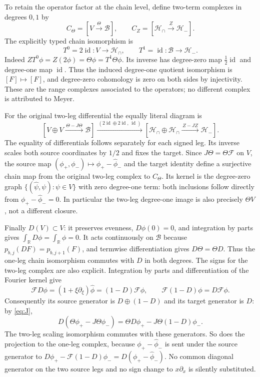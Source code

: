 \documentclass[11pt]{article}
\newcommand{\B}{\mathscr B}
\newcommand{\HH}{\mathcal H}
\newcommand{\R}{\mathbb R}
\newcommand{\id}{\operatorname{id}}
\newcommand{\F}{\mathcal F}
\begin{document}
To retain the operator factor at the chain level, define two-term
complexes in degrees $0,1$ by
\[
 C_\Theta=[V\xrightarrow{\Theta}\B],\qquad
 C_Z=[\HH_\cap\xrightarrow{Z}\HH_-].
\]
The explicitly typed chain isomorphism is
\begin{equation}\label{eq:chain}
 T^0=2\id:V\longrightarrow\HH_\cap,\qquad
 T^1=\id:\B\longrightarrow\HH_-.
\end{equation}
Indeed $ZT^0\phi=Z(2\phi)=\Theta\phi=T^1\Theta\phi$.
Its inverse has degree-zero map $\tfrac12\id$ and degree-one map
$\id$. Thus the induced degree-one quotient isomorphism is
$[F]\mapsto[F]$, and degree-zero cohomology is zero on both sides
by injectivity. These are the range complexes associated to the
operators; no different complex is attributed to Meyer.

For the original two-leg differential the equally literal diagram is
\[
 [V\oplus V\xrightarrow{\,\Theta-J\Theta\,}\B]
 \xrightarrow{\ (2\id\oplus2\id,\,\id)\ }
 [\HH_\cap\oplus\HH_\cap\xrightarrow{\,Z-JZ\,}\HH_-].
\]
The equality of differentials follows separately for each signed leg.
Its inverse scales both source coordinates by $1/2$ and fixes the
target. Since $J\Theta=\Theta\F$ on $V$, the source map
$(\phi_+,\phi_-)\mapsto\phi_+-\widehat\phi_-$ and the target identity
define a surjective chain map from the original two-leg complex to
$C_\Theta$. Its kernel is the degree-zero graph
$\{(\widehat\psi,\psi):\psi\in V\}$ with zero degree-one term:
both inclusions follow directly from
$\phi_+-\widehat\phi_-=0$. In particular the two-leg degree-one image
is also precisely $\Theta V$, not a different closure.

Finally $D(V)\subset V$: it preserves evenness, $D\phi(0)=0$, and
integration by parts gives $\int_\R D\phi=\int_\R\phi=0$.
It acts continuously on $\B$ because $p_{b,j}(DF)=p_{b,j+1}(F)$,
and termwise differentiation gives $D\Theta=\Theta D$. Thus the
one-leg chain isomorphism commutes with $D$ in both degrees.
The signs for the two-leg complex are also explicit. Integration by
parts and differentiation of the Fourier kernel give
\[
 \F D\phi=(1+\xi\partial_\xi)\widehat\phi
           =(1-D)\F\phi,
 \qquad \F(1-D)\phi=D\F\phi.
\]
Consequently its source generator is $D\oplus(1-D)$ and its target
generator is $D$: by \eqref{eq:J},
\[
 D(\Theta\phi_+-J\Theta\phi_-)
    =\Theta D\phi_+-J\Theta(1-D)\phi_-.
\]
The two-leg scaling isomorphism commutes with these generators.
So does the projection to the one-leg complex, because
$\phi_+-\widehat\phi_-$ is sent under the source generator to
$D\phi_+-\F(1-D)\phi_-=D(\phi_+-\widehat\phi_-)$.
No common diagonal generator on the two source legs and no sign
change to $x\partial_x$ is silently substituted.
\end{document}
